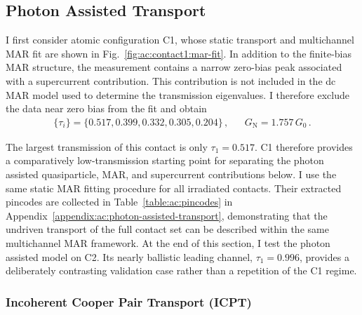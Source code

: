 \subsection{Photon Assisted Transport}
\label{subsec:ac:photon-assisted-transport}

    I first consider atomic configuration C1, whose static transport and multichannel MAR fit are shown in Fig.~\ref{fig:ac:contact1:mar-fit}. In addition to the finite-bias MAR structure, the measurement contains a narrow zero-bias peak associated with a supercurrent contribution. This contribution is not included in the dc MAR model used to determine the transmission eigenvalues. I therefore exclude the data near zero bias from the fit and obtain
    \begin{align}
        \{\tau_i\} = \{0.517, 0.399, 0.332, 0.305, 0.204\}\,, &&
        G_\mathrm{N} = 1.757\,G_0\,.
        \label{eq:ac:contact1:pincode}
    \end{align}


    The largest transmission of this contact is only $\tau_1=0.517$. C1 therefore provides a comparatively low-transmission starting point for separating the photon assisted quasiparticle, MAR, and supercurrent contributions below. I use the same static MAR fitting procedure for all irradiated contacts. Their extracted pincodes are collected in Table~\ref{table:ac:pincodes} in Appendix~\ref{appendix:ac:photon-assisted-transport}, demonstrating that the undriven transport of the full contact set can be described within the same multichannel MAR framework. At the end of this section, I test the photon assisted model on C2. Its nearly ballistic leading channel, $\tau_1=0.996$, provides a deliberately contrasting validation case rather than a repetition of the C1 regime.

    \subsubsection*{Incoherent Cooper Pair Transport (ICPT)}

